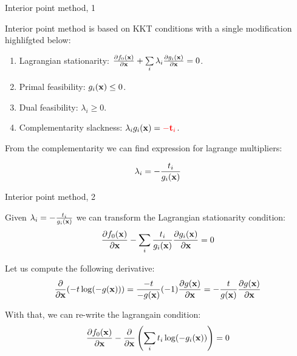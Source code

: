 \documentclass{beamer}
\begin{document}
\begin{frame}{Interior point method, 1}
	\begin{flushleft}
		
		Interior point method is based on KKT conditions with a single modification highlifgted below:
		
		\begin{enumerate}
			\item Lagrangian stationarity: $\frac{\partial f_0(\mathbf{x}) }{\partial \mathbf{x}} 
			+
			\sum\limits_i 
			\lambda_i  \frac{\partial g_i(\mathbf{x}) }{\partial \mathbf{x}} 
			= 0$.
			
			\item Primal feasibility: $g_i(\mathbf{x}) \leq 0$.
			
			\item Dual feasibility: $\lambda_i \geq 0$.
			
			\item Complementarity slackness: $\lambda_i g_i(\mathbf{x}) = \textcolor{red}{-\mathbf{t}_i}$.
		\end{enumerate}
		
		\bigskip
		
		From the complementarity we can find expression for lagrange multipliers:
		
		\begin{equation}
			\lambda_i = -\frac{t_i}{g_i(\mathbf{x})}
		\end{equation}
		
	\end{flushleft}
\end{frame}




\begin{frame}{Interior point method, 2}
	\begin{flushleft}
		
		Given $\lambda_i = -\frac{t_i}{g_i(\mathbf{x})}$ we can transform the Lagrangian stationarity condition:
		\begin{equation}
			\frac{\partial f_0(\mathbf{x})}{\partial \mathbf{x}} 
			-
			\sum\limits_i 
			\frac{t_i}{g_i(\mathbf{x})}
			\frac{\partial g_i(\mathbf{x})}{\partial \mathbf{x}} 
			= 0
		\end{equation}
		
		Let us compute the following derivative:
		\begin{align}
			\frac{\partial}{\partial \mathbf{x}} (  -t \log ( -g(\mathbf{x}) )  ) 
			= \frac{-t}{-g(\mathbf{x})} (-1) \frac{\partial g(\mathbf{x})}{\partial \mathbf{x}} 
			= -\frac{t}{g(\mathbf{x})} \frac{\partial g(\mathbf{x})}{\partial \mathbf{x}} 
		\end{align}
		
		With that, we can re-write the lagrangain condition:
		\begin{equation}
			\frac{\partial f_0(\mathbf{x})}{\partial \mathbf{x}} 
			-
			\frac{\partial}{\partial \mathbf{x}} 
			\left(
			\sum\limits_i 
			t_i \log (- g_i (\mathbf{x})) 
			\right) = 0
		\end{equation}
		
		
	\end{flushleft}
\end{frame}
\end{document}
